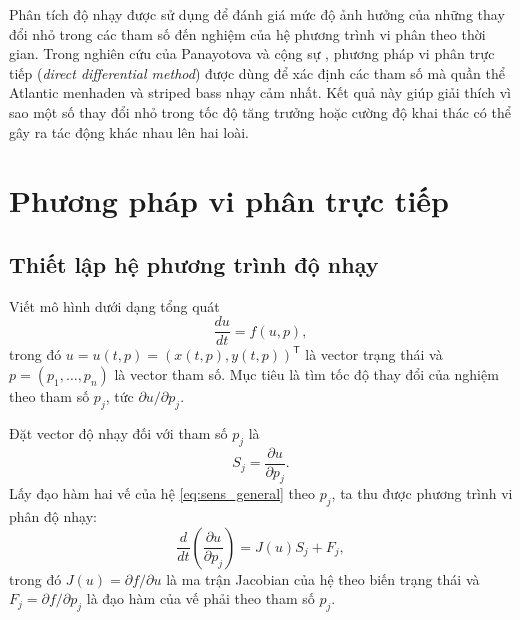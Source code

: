 Phân tích độ nhạy được sử dụng để đánh giá mức độ ảnh hưởng của những thay đổi nhỏ trong các tham số đến nghiệm của hệ phương trình vi phân theo thời gian. Trong nghiên cứu của Panayotova và cộng sự \cite{panayotova2023bioeconomic}, phương pháp vi phân trực tiếp (\textit{direct differential method}) được dùng để xác định các tham số mà quần thể Atlantic menhaden và striped bass nhạy cảm nhất. Kết quả này giúp giải thích vì sao một số thay đổi nhỏ trong tốc độ tăng trưởng hoặc cường độ khai thác có thể gây ra tác động khác nhau lên hai loài.

\section{Phương pháp vi phân trực tiếp}
\label{sec:direct_sensitivity}

\subsection{Thiết lập hệ phương trình độ nhạy}

Viết mô hình dưới dạng tổng quát
\begin{equation}
\label{eq:sens_general}
\frac{du}{dt}=f(u,p),
\tag{34}
\end{equation}
trong đó \(u=u(t,p)=(x(t,p),y(t,p))^\mathsf{T}\) là vector trạng thái và \(p=(p_1,\ldots,p_n)\) là vector tham số. Mục tiêu là tìm tốc độ thay đổi của nghiệm theo tham số \(p_j\), tức \(\partial u/\partial p_j\).

Đặt vector độ nhạy đối với tham số \(p_j\) là
\[
S_j=\frac{\partial u}{\partial p_j}.
\]
Lấy đạo hàm hai vế của hệ \eqref{eq:sens_general} theo \(p_j\), ta thu được phương trình vi phân độ nhạy:
\begin{equation}
\label{eq:sens_ode}
\frac{d}{dt}\left(\frac{\partial u}{\partial p_j}\right)
=J(u)S_j+F_j,
\tag{35}
\end{equation}
trong đó \(J(u)=\partial f/\partial u\) là ma trận Jacobian của hệ theo biến trạng thái và \(F_j=\partial f/\partial p_j\) là đạo hàm của vế phải theo tham số \(p_j\).

